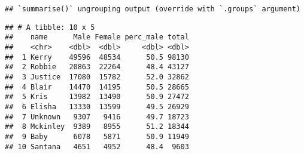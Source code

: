 \documentclass[
]{article}
\newenvironment{Shaded}{\begin{snugshade}}{\end{snugshade}}
\newcommand{\DataTypeTok}[1]{\textcolor[rgb]{0.13,0.29,0.53}{#1}}
\newcommand{\DecValTok}[1]{\textcolor[rgb]{0.00,0.00,0.81}{#1}}
\newcommand{\KeywordTok}[1]{\textcolor[rgb]{0.13,0.29,0.53}{\textbf{#1}}}
\newcommand{\NormalTok}[1]{#1}
\newcommand{\OperatorTok}[1]{\textcolor[rgb]{0.81,0.36,0.00}{\textbf{#1}}}
\newcommand{\StringTok}[1]{\textcolor[rgb]{0.31,0.60,0.02}{#1}}
\begin{document}
\begin{Shaded}
\end{Shaded}

\begin{verbatim}
## `summarise()` ungrouping output (override with `.groups` argument)
\end{verbatim}

\begin{verbatim}
## # A tibble: 10 x 5
##    name      Male Female perc_male total
##    <chr>    <dbl>  <dbl>     <dbl> <dbl>
##  1 Kerry    49596  48534      50.5 98130
##  2 Robbie   20863  22264      48.4 43127
##  3 Justice  17080  15782      52.0 32862
##  4 Blair    14470  14195      50.5 28665
##  5 Kris     13982  13490      50.9 27472
##  6 Elisha   13330  13599      49.5 26929
##  7 Unknown   9307   9416      49.7 18723
##  8 Mckinley  9389   8955      51.2 18344
##  9 Baby      6078   5871      50.9 11949
## 10 Santana   4651   4952      48.4  9603
\end{verbatim}
\end{document}
